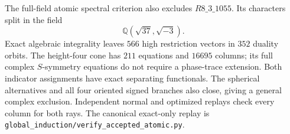 The full-field atomic spectral criterion also excludes $R8\_3\_1055$.
Its characters split in the field
\[
  \mathbb Q(\sqrt{37},\sqrt{-3}).
\]
Exact algebraic integrality leaves
$566$ high restriction vectors in $352$ duality orbits. The
height-four cone has $211$ equations and $16695$ columns; its full
complex $S$-symmetry equations do not require a phase-trace extension.
Both indicator assignments have exact separating functionals.
The spherical alternatives and all four oriented signed branches
also close, giving a general complex exclusion. Independent normal
and optimized replays check every column for both rays.
The canonical exact-only replay is
\texttt{global\_induction/verify\_accepted\_atomic.py}.

